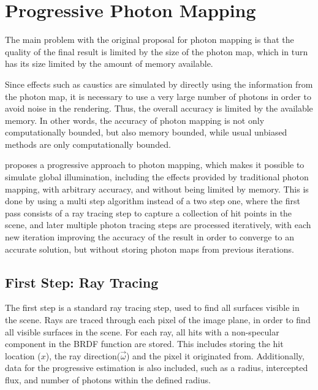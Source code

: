 \documentclass[main.tex]{subfiles}
\begin{document}
\section{Progressive Photon Mapping} \label{section:ppm}

The main problem with the original proposal for photon mapping is that the quality of the final result is limited by the size of the photon map, which in turn has its size limited by the amount of memory available.

Since effects such as caustics are simulated by directly using the information from the photon map, it is necessary to use a very large number of photons in order to avoid noise in the rendering. Thus, the overall accuracy is limited by the available memory. In other words, the accuracy of photon mapping is not only computationally bounded, but also memory bounded, while usual unbiased methods are only computationally bounded.

\cite{hachisuka2008progressive} proposes a progressive approach to photon mapping, which makes it possible to simulate global illumination, including the effects provided by traditional photon mapping, with arbitrary accuracy, and without being limited by memory. This is done by using a multi step algorithm instead of a two step one, where the first pass consists of a ray tracing step to capture a collection of hit points in the scene, and later multiple photon tracing steps are processed iteratively, with each new iteration improving the accuracy of the result in order to converge to an accurate solution, but without storing photon maps from previous iterations.


\subsection{First Step: Ray Tracing}

The first step is a standard ray tracing step, used to find all surfaces visible in the scene. Rays are traced through each pixel of the image plane, in order to find all visible surfaces in the scene. For each ray, all hits with a non-specular component in the \acs{BRDF} function are stored. This includes storing the hit location ($x$), the ray direction($\vec{\omega}$) and the pixel it originated from. Additionally, data for the progressive estimation is also included, such as a radius, intercepted flux, and number of photons within the defined radius.
\end{document}
